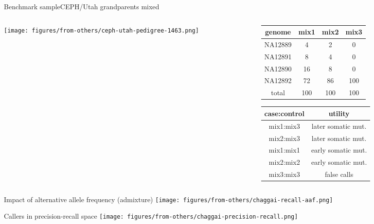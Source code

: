 \documentclass{beamer}
\begin{document}
\begin{frame}[label=benchmark]{Benchmark sample}{CEPH/Utah grandparents mixed}
\begin{center}
\begin{columns}[t]
\begin{column}{0.5\textwidth}

\texttt{[image: figures/from-others/ceph-utah-pedigree-1463.png]}
\end{column}

\begin{column}{0.5\textwidth}

\small
{
\begin{tabular}{cccc}
genome & mix1 & mix2 & mix3\\
\hline
NA12889 & 4 & 2 & 0\\
NA12891 & 8 & 4 & 0\\
NA12890 & 16 & 8 & 0\\
NA12892 & 72 & 86 & 100\\
\hline
total & 100 & 100 & 100\\
\end{tabular}
}
\vfill
{
\begin{tabular}{cc}
case:control & utility \\
\hline
\hline
mix1:mix3 & later somatic mut. \\
mix2:mix3 & later somatic mut. \\
\hline
mix1:mix1 & early somatic mut. \\
mix2:mix2 & early somatic mut. \\
\hline
mix3:mix3 & false calls \\
\end{tabular}
}
\end{column}
\end{columns}
\end{center}
\end{frame}

\begin{frame}{Impact of alternative allele frequency (admixture)}
\texttt{[image: figures/from-others/chaggai-recall-aaf.png]}
\end{frame}

\begin{frame}[label=precrecall]{Callers in precision-recall space}
\texttt{[image: figures/from-others/chaggai-precision-recall.png]}
\end{frame}
\end{document}
